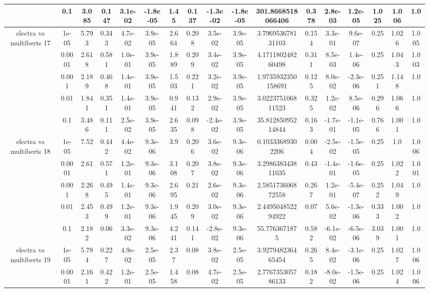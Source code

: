 \begin{tabular}{|c|c|c|c|c|c|c|c|c|c|c|c|c|c|c|c|c|}
 & 0.1 & 3.085 & 0.147 & 3.1e-02 & -1.8e-05 & 1.45 & 0.137 & -1.3e-02 & -1.8e-05 & 301.8668518066406 & 0.378 & 2.8e-03 & 1.2e-05 & 1.025 & 1.006 & 1.0 \\
\hline
\multirow{5}{*}{electra  vs multiberts 17} & 1e-05 & 5.793 & 0.343 & 4.7e-02 & 3.9e-05 & 2.664 & 0.208 & 3.5e-02 & 3.9e-05 & 3.796953678131103 & 0.154 & 3.3e-01 & 9.6e-07 & 0.25 & 1.026 & 1.005 \\
 & 0.0001 & 2.618 & 0.581 & 1.0e-01 & 3.9e-05 & 1.889 & 0.209 & 3.4e-02 & 3.9e-05 & 4.171180248260498 & 0.311 & 8.5e-03 & 1.4e-06 & 0.25 & 1.043 & 1.003 \\
 & 0.001 & 2.189 & 0.468 & 1.4e-01 & 3.9e-05 & 1.503 & 0.221 & 3.2e-02 & 3.9e-05 & 1.9735932350158691 & 0.125 & 8.0e-02 & -2.3e-06 & 0.251 & 1.148 & 1.0 \\
 & 0.01 & 1.841 & 0.351 & 1.4e-01 & 3.9e-05 & 0.941 & 0.132 & 2.9e-02 & 3.9e-05 & 3.022375106811523 & 0.325 & 1.2e-02 & 8.5e-06 & 0.296 & 1.066 & 1.0 \\
 & 0.1 & 3.486 & 0.111 & 2.5e-02 & 3.9e-05 & 2.635 & 0.098 & -2.4e-02 & 3.9e-05 & 35.81285095214844 & 0.163 & -1.7e-01 & -1.1e-05 & 0.766 & 1.001 & 1.0 \\
\hline
\multirow{5}{*}{electra  vs multiberts 18} & 1e-05 & 7.52 & 0.442 & 4.4e-02 & 9.3e-06 & 3.9 & 0.206 & 3.6e-02 & 9.3e-06 & 0.10333689302206 & 0.004 & -2.5e-02 & -1.5e-05 & 0.25 & 1.0 & 1.006 \\
 & 0.0001 & 2.61 & 0.571 & 1.2e-01 & 9.3e-06 & 3.108 & 0.207 & 3.8e-02 & 9.3e-06 & 3.298638343811035 & 0.43 & -1.4e-01 & -1.6e-05 & 0.25 & 1.022 & 1.001 \\
 & 0.001 & 2.268 & 0.495 & 1.4e-01 & 9.3e-06 & 2.695 & 0.21 & 2.6e-02 & 9.3e-06 & 2.585173606872558 & 0.267 & 1.2e-01 & -5.4e-07 & 0.252 & 1.049 & 1.0 \\
 & 0.01 & 2.453 & 0.499 & 1.2e-01 & 9.3e-06 & 1.945 & 0.209 & 3.0e-02 & 9.3e-06 & 2.449504852294922 & 0.07 & 5.6e-02 & -1.3e-06 & 0.333 & 1.002 & 1.0 \\
 & 0.1 & 2.182 & 0.06 & 3.3e-02 & 9.3e-06 & 4.241 & 0.141 & -2.8e-02 & 9.3e-06 & 55.7763671875 & 0.582 & -6.1e-02 & -6.5e-06 & 3.039 & 1.001 & 1.0 \\
\hline
\multirow{5}{*}{electra  vs multiberts 19} & 1e-05 & 5.784 & 0.227 & 4.9e-02 & 2.5e-05 & 2.37 & 0.08 & 3.8e-02 & 2.5e-05 & 3.927948236465454 & 0.265 & 8.4e-02 & -3.1e-06 & 0.25 & 1.027 & 1.006 \\
 & 0.0001 & 2.161 & 0.422 & 1.2e-01 & 2.5e-05 & 1.458 & 0.08 & 4.7e-02 & 2.5e-05 & 2.776735305786133 & 0.182 & -8.0e-02 & -1.5e-06 & 0.25 & 1.024 & 1.006 \\

\end{tabular}
